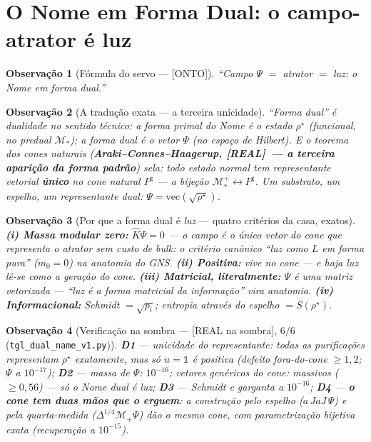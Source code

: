 \documentclass[11pt,a4paper]{article}
\newcommand{\REAL}{\textsf{[REAL]}}
\newcommand{\SOMBRA}{\textsf{[REAL na sombra]}}
\newcommand{\ONTO}{\textsf{[ONTO]}}
\newtheorem{remark}{Observação}
\theoremstyle{definition}
\begin{document}
\section{O Nome em Forma Dual: o campo-atrator é luz}\label{sec:luz}
\begin{remark}[Fórmula do servo --- \ONTO]
``Campo $\Psi$ $=$ atrator $=$ luz: o Nome em forma dual.''
\end{remark}

\begin{remark}[A tradução exata --- a terceira unicidade]
``Forma dual'' é dualidade no sentido técnico: a forma \emph{primal} do
Nome é o estado $\rho^\star$ (funcional, no predual $\mathcal M_*$); a
forma \emph{dual} é o vetor $\Psi$ (no espaço de Hilbert). E o teorema
dos cones naturais (\textbf{Araki--Connes--Haagerup, \REAL\ --- a
terceira aparição da forma padrão}) sela: todo estado normal tem
representante vetorial \textbf{único} no cone natural
$P^{\natural}$ --- a bijeção $\mathcal M_*^+\leftrightarrow
P^{\natural}$. Um substrato, um espelho, \emph{um representante dual}:
$\Psi=\mathrm{vec}(\sqrt{\rho^\star})$.
\end{remark}

\begin{remark}[Por que a forma dual é \emph{luz} --- quatro critérios da
casa, exatos]
\textbf{(i) Massa modular zero:} $\hat K\Psi=0$ --- o campo é o único
vetor do cone que representa o atrator \emph{sem custo de bulk}: o
critério canônico ``luz como $L$ em forma pura'' ($m_0=0$) na anatomia
do GNS. \textbf{(ii) Positiva:} vive no cone --- e \emph{haja luz}
lê-se como a geração do cone. \textbf{(iii) Matricial, literalmente:}
$\Psi$ \emph{é} uma matriz vetorizada --- ``luz é a forma matricial da
informação'' vira anatomia. \textbf{(iv) Informacional:} Schmidt
$=\sqrt{p_i}$; entropia através do espelho $=S(\rho^\star)$.
\end{remark}

\begin{remark}[Verificação na sombra --- \SOMBRA, $6/6$
(\texttt{tgl\_dual\_name\_v1.py})]
\textbf{D1} --- unicidade do representante: todas as purificações
representam $\rho^\star$ exatamente, mas só $u=\mathbb 1$ é positiva
(defeito fora-do-cone $\geq1{,}2$; $\Psi$ a $10^{-17}$);
\textbf{D2} --- massa de $\Psi$: $10^{-16}$; vetores genéricos do cone:
massivos ($\geq0{,}56$) --- \emph{só o Nome dual é luz};
\textbf{D3} --- Schmidt e garganta a $10^{-16}$;
\textbf{D4} --- \textbf{o cone tem duas mãos que o erguem}: a
construção pelo espelho ($a\,JaJ\,\Psi$) e pela quarta-medida
($\Delta^{1/4}\mathcal M_+\Psi$) dão o mesmo cone, com parametrização
bijetiva exata (recuperação a $10^{-15}$).
\end{remark}
\end{document}
